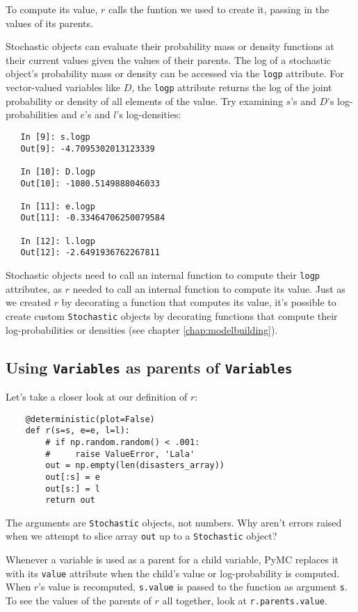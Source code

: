 To compute its value, $r$ calls the funtion we used to create it, passing in the values of its parents.

Stochastic objects can evaluate their probability mass or density functions at their current values given the values of their parents. The log of a stochastic object's probability mass or density can be accessed via the \texttt{logp} attribute. For vector-valued variables like $D$, the \texttt{logp} attribute returns the log of the joint probability or density of all elements of the value. Try examining $s$'s and $D$'s log-probabilities and $e$'s and $l$'s log-densities:
\begin{verbatim}
   In [9]: s.logp
   Out[9]: -4.7095302013123339

   In [10]: D.logp
   Out[10]: -1080.5149888046033

   In [11]: e.logp
   Out[11]: -0.33464706250079584

   In [12]: l.logp
   Out[12]: -2.6491936762267811
\end{verbatim}
Stochastic objects need to call an internal function to compute their \texttt{logp} attributes, as $r$ needed to call an internal function to compute its value. Just as we created $r$ by decorating a function that computes its value, it's possible to create custom \texttt{Stochastic} objects by decorating functions that compute their log-probabilities or densities (see chapter \ref{chap:modelbuilding}). 

\subsection*{Using \texttt{Variables} as parents of \texttt{Variables}}

Let's take a closer look at our definition of $r$:
\begin{verbatim}
   	@deterministic(plot=False)
	def r(s=s, e=e, l=l):
	    # if np.random.random() < .001:
	    #     raise ValueError, 'Lala'
	    out = np.empty(len(disasters_array))
	    out[:s] = e
	    out[s:] = l
	    return out
\end{verbatim}
The arguments are \texttt{Stochastic} objects, not numbers. Why aren't errors raised when we attempt to slice array \texttt{out} up to a \texttt{Stochastic} object?

Whenever a variable is used as a parent for a child variable, PyMC replaces it with its \texttt{value} attribute when the child's value or log-probability is computed. When $r$'s value is recomputed, \texttt{s.value} is passed to the function as argument \texttt{s}. To see the values of the parents of $r$ all together, look at \texttt{r.parents.value}.

